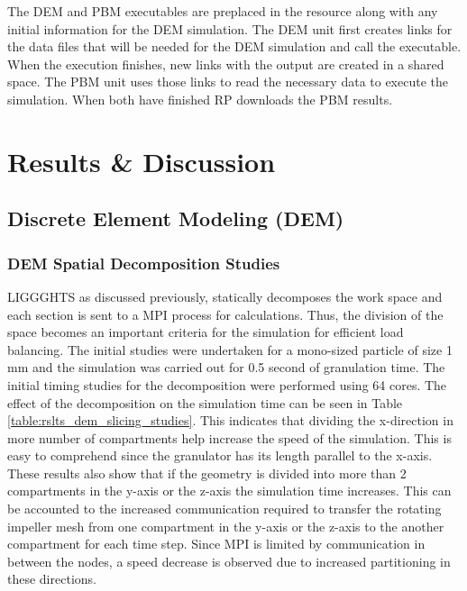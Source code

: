 \documentclass[preprint,11pt,authoryear]{elsarticle}
\begin{document}
The DEM and PBM executables are preplaced in the resource along with any initial 
information for the DEM simulation. The DEM unit first creates links for the data files that will 
be needed for the DEM simulation and call the executable. When the execution finishes, new links 
with the output are created in a shared space. The PBM unit uses those links to read the necessary 
data to execute the simulation. When both have finished RP downloads the PBM results.



\section{Results \& Discussion}
\label{sec:Results}
\subsection{Discrete Element Modeling (DEM)}
\subsubsection{DEM Spatial Decomposition Studies}
LIGGGHTS as discussed previously, statically decomposes the work space and each section is sent to 
a MPI process for calculations. Thus, the division of the space becomes an important criteria for the 
simulation for efficient load balancing. The initial studies were undertaken for a mono-sized particle of 
size 1 mm and the simulation was carried out for 0.5 second of granulation time. The initial timing studies
for the decomposition were performed using 64 cores. The effect of the decomposition on the simulation 
time can be seen in Table \ref{table:rslts_dem_slicing_studies}. This indicates that dividing the 
x-direction in more number of compartments help increase the speed of the simulation. This is easy to 
comprehend since the granulator has its length parallel to the x-axis. These results also show that if 
the geometry is divided into more than 2 compartments in the y-axis or the z-axis the simulation time 
increases. This can be accounted to the increased communication required to transfer the rotating 
impeller mesh from one compartment in the y-axis or the z-axis to the another compartment for each 
time step. Since MPI is limited by communication in between the nodes, a speed decrease is observed 
due to increased partitioning in these directions.
\end{document}
